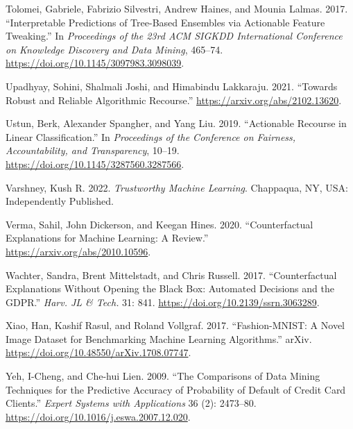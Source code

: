 \documentclass{juliacon}
\newlength{\cslhangindent}
\newenvironment{CSLReferences}[2] %
 {\begin{list}{}{%
  \setlength{\itemindent}{0pt}
  \setlength{\leftmargin}{0pt}
  \setlength{\parsep}{0pt}
  \ifodd #1
   \setlength{\leftmargin}{\cslhangindent}
   \setlength{\itemindent}{-1\cslhangindent}
  \fi
  \setlength{\itemsep}{#2\baselineskip}}}
 {\end{list}}
\begin{document}
\begin{CSLReferences}{1}{0}
Tolomei, Gabriele, Fabrizio Silvestri, Andrew Haines, and Mounia Lalmas.
2017. {``Interpretable {Predictions} of {Tree}-Based {Ensembles} via
{Actionable} {Feature} {Tweaking}.''} In \emph{Proceedings of the 23rd
{ACM} {SIGKDD} {International} {Conference} on {Knowledge} {Discovery}
and {Data} {Mining}}, 465--74.
\url{https://doi.org/10.1145/3097983.3098039}.

Upadhyay, Sohini, Shalmali Joshi, and Himabindu Lakkaraju. 2021.
{``Towards {Robust} and {Reliable Algorithmic Recourse}.''}
\url{https://arxiv.org/abs/2102.13620}.

Ustun, Berk, Alexander Spangher, and Yang Liu. 2019. {``Actionable
Recourse in Linear Classification.''} In \emph{Proceedings of the
{Conference} on {Fairness}, {Accountability}, and {Transparency}},
10--19. \url{https://doi.org/10.1145/3287560.3287566}.

Varshney, Kush R. 2022. \emph{Trustworthy {Machine Learning}}.
{Chappaqua, NY, USA}: {Independently Published}.

Verma, Sahil, John Dickerson, and Keegan Hines. 2020. {``Counterfactual
Explanations for Machine Learning: {A} Review.''}
\url{https://arxiv.org/abs/2010.10596}.

Wachter, Sandra, Brent Mittelstadt, and Chris Russell. 2017.
{``Counterfactual Explanations Without Opening the Black Box:
{Automated} Decisions and the {GDPR}.''} \emph{Harv. JL \& Tech.} 31:
841. \url{https://doi.org/10.2139/ssrn.3063289}.

Xiao, Han, Kashif Rasul, and Roland Vollgraf. 2017. {``Fashion-{MNIST}:
A {Novel} {Image} {Dataset} for {Benchmarking} {Machine} {Learning}
{Algorithms}.''} arXiv. \url{https://doi.org/10.48550/arXiv.1708.07747}.

Yeh, I-Cheng, and Che-hui Lien. 2009. {``The Comparisons of Data Mining
Techniques for the Predictive Accuracy of Probability of Default of
Credit Card Clients.''} \emph{Expert Systems with Applications} 36 (2):
2473--80. \url{https://doi.org/10.1016/j.eswa.2007.12.020}.

\end{CSLReferences}
\end{document}
